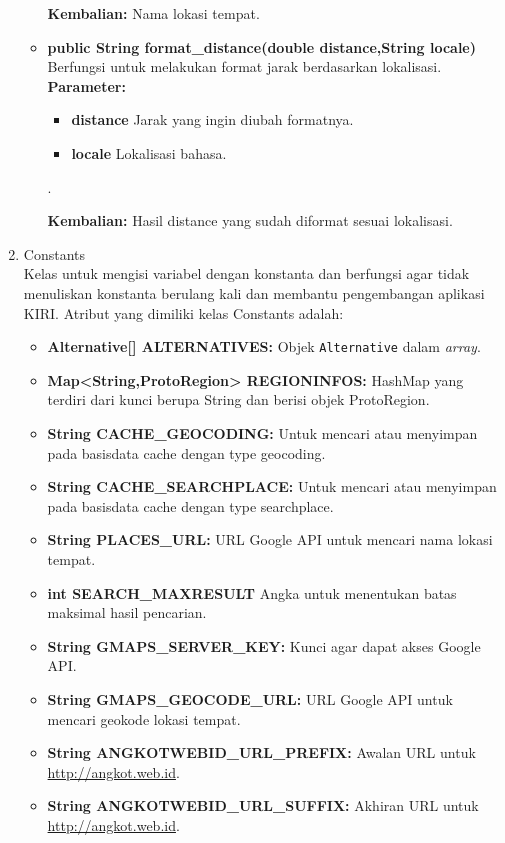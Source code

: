 \begin{enumerate}
\begin{itemize}
		\textbf{Kembalian:}  Nama lokasi tempat.
		
		\item \textbf{public String format\_distance(double distance,String locale)}\\
		Berfungsi untuk melakukan format jarak berdasarkan lokalisasi.\\
		\textbf{Parameter:}
				\begin{itemize}
					\item \textbf{distance} Jarak yang ingin diubah formatnya.
					\item \textbf{locale} Lokalisasi bahasa.
				\end{itemize}.
				
		\textbf{Kembalian:}  Hasil distance yang sudah diformat sesuai lokalisasi.
	\end{itemize}
	\item Constants\\
	Kelas untuk mengisi variabel dengan konstanta dan berfungsi agar tidak menuliskan konstanta berulang kali dan membantu pengembangan aplikasi KIRI. Atribut yang dimiliki kelas Constants adalah:
	\begin{itemize}
		\item \textbf{Alternative[] ALTERNATIVES:} Objek \verb!Alternative! dalam \textit{array}.
		\item \textbf{Map<String,ProtoRegion> REGIONINFOS:} HashMap yang terdiri dari kunci berupa String dan berisi objek ProtoRegion.
		\item \textbf{String CACHE\_GEOCODING:} Untuk mencari atau menyimpan pada basisdata cache dengan type geocoding.
		\item \textbf{String CACHE\_SEARCHPLACE:} Untuk mencari atau menyimpan pada basisdata cache dengan type searchplace.
		\item \textbf{String PLACES\_URL:} URL Google API untuk mencari nama lokasi tempat.
		\item \textbf{int SEARCH\_MAXRESULT} Angka untuk menentukan batas maksimal hasil pencarian.
		\item \textbf{String GMAPS\_SERVER\_KEY:} Kunci agar dapat akses Google API.
		\item \textbf{String GMAPS\_GEOCODE\_URL:} URL Google API untuk mencari geokode lokasi tempat.
		\item \textbf{String ANGKOTWEBID\_URL\_PREFIX:} Awalan URL untuk \url{http://angkot.web.id}.
		\item \textbf{String ANGKOTWEBID\_URL\_SUFFIX:} Akhiran URL untuk \url{http://angkot.web.id}.

\end{itemize}
\end{enumerate}
